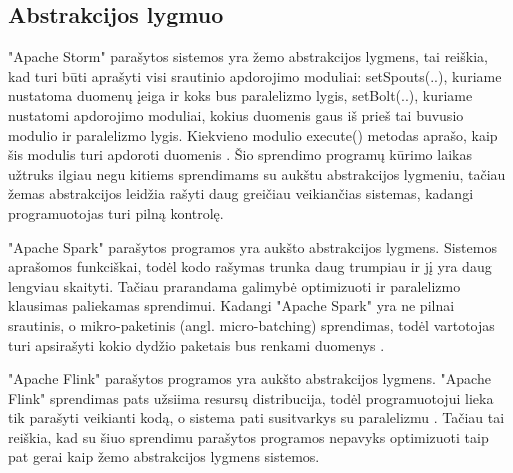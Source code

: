 \documentclass{VUMIFPSbakalaurinis}
\begin{document}
\subsection{Abstrakcijos lygmuo}

"Apache Storm" parašytos sistemos yra žemo abstrakcijos lygmens, tai reiškia, kad turi būti aprašyti visi srautinio apdorojimo moduliai: 
setSpouts(..), kuriame nustatoma duomenų įeiga ir koks bus paralelizmo lygis, setBolt(..), kuriame nustatomi apdorojimo moduliai, kokius duomenis gaus iš prieš tai buvusio modulio ir paralelizmo lygis. Kiekvieno modulio execute() metodas aprašo, kaip šis modulis turi apdoroti duomenis \cite{tutpoint}. Šio sprendimo programų kūrimo laikas užtruks ilgiau negu kitiems sprendimams su aukštu abstrakcijos lygmeniu, tačiau žemas abstrakcijos leidžia rašyti daug greičiau veikiančias sistemas, kadangi programuotojas turi pilną kontrolę. \par

"Apache Spark" parašytos programos yra aukšto abstrakcijos lygmens. Sistemos aprašomos funkciškai, todėl kodo rašymas trunka daug trumpiau ir jį yra daug lengviau skaityti. Tačiau prarandama galimybė optimizuoti ir paralelizmo klausimas paliekamas sprendimui. Kadangi "Apache Spark" yra ne pilnai srautinis, o mikro-paketinis (angl. micro-batching) sprendimas, todėl vartotojas turi apsirašyti kokio dydžio paketais bus renkami duomenys \cite{shoro2015big}. \par

"Apache Flink" parašytos programos yra aukšto abstrakcijos lygmens. "Apache Flink" sprendimas pats užsiima resursų distribucija, todėl programuotojui lieka tik parašyti veikianti kodą, o sistema pati susitvarkys su paralelizmu \cite{flinkdoc}. Tačiau tai reiškia, kad su šiuo sprendimu parašytos programos nepavyks optimizuoti taip pat gerai kaip žemo abstrakcijos lygmens sistemos. \par
\end{document}
